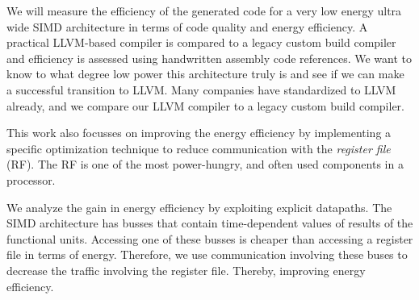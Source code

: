 We will measure the efficiency of the generated code for a very low energy ultra wide SIMD architecture in terms of code quality and energy efficiency. A practical LLVM-based compiler is compared to a legacy custom build compiler and efficiency is assessed using handwritten assembly code references. We want to know to what degree low power this architecture truly is and see if we can make a successful transition to LLVM. Many companies have standardized to LLVM already, and we compare our LLVM compiler to a legacy custom build compiler. %

This work also focusses on improving the energy efficiency by implementing a specific optimization technique to reduce communication with the \emph{register file} (RF). The RF is one of the most power-hungry, and often used components in a processor. 

We analyze the gain in energy efficiency by exploiting explicit datapaths. The SIMD architecture has busses that contain time-dependent values of results of the functional units. Accessing one of these busses is cheaper than accessing a register file in terms of energy. Therefore, we use communication involving these buses to decrease the traffic involving the register file. Thereby, improving energy efficiency. 


